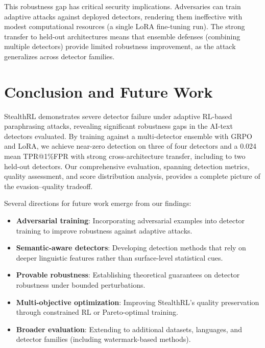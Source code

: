 \documentclass[11pt]{article}
\begin{document}
This robustness gap has critical security implications. Adversaries can train adaptive attacks against deployed detectors, rendering them ineffective with modest computational resources (a single LoRA fine-tuning run). The strong transfer to held-out architectures means that ensemble defenses (combining multiple detectors) provide limited robustness improvement, as the attack generalizes across detector families.

\section{Conclusion and Future Work}
\label{sec:conclusion}

StealthRL demonstrates severe detector failure under adaptive RL-based paraphrasing attacks, revealing significant robustness gaps in the AI-text detectors evaluated. By training against a multi-detector ensemble with GRPO and LoRA, we achieve near-zero detection on three of four detectors and a 0.024 mean TPR@1\%FPR with strong cross-architecture transfer, including to two held-out detectors. Our comprehensive evaluation, spanning detection metrics, quality assessment, and score distribution analysis, provides a complete picture of the evasion--quality tradeoff.

Several directions for future work emerge from our findings:
\begin{itemize}[leftmargin=*,itemsep=2pt]
  \item \textbf{Adversarial training}: Incorporating adversarial examples into detector training to improve robustness against adaptive attacks.
  \item \textbf{Semantic-aware detectors}: Developing detection methods that rely on deeper linguistic features rather than surface-level statistical cues.
  \item \textbf{Provable robustness}: Establishing theoretical guarantees on detector robustness under bounded perturbations.
  \item \textbf{Multi-objective optimization}: Improving StealthRL's quality preservation through constrained RL or Pareto-optimal training.
  \item \textbf{Broader evaluation}: Extending to additional datasets, languages, and detector families (including watermark-based methods).
\end{itemize}
\end{document}
